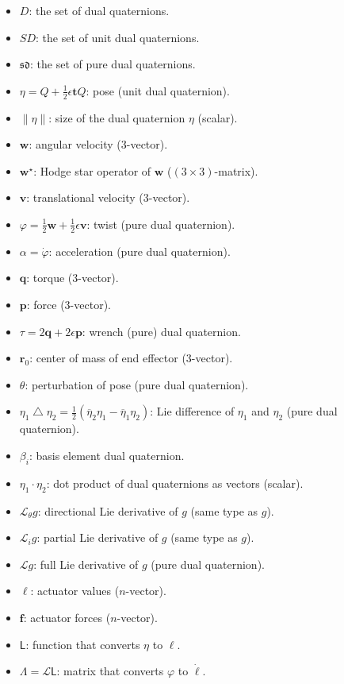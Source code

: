 \documentclass[reqno,12pt]{amsart}
\newcommand\starop[1]{#1^\star}
\newcommand\setdualquat{D}
\newcommand\setunitdualquat{SD}
\newcommand\setpuredualquat{\mathfrak{sd}}
\newcommand{\liediff}{\mathbin{\triangle}}
\newcommand{\liederiv}{\mathcal L}
\begin{document}
\begin{itemize}
\item $\setdualquat$: the set of dual quaternions.
\item $\setunitdualquat$: the set of unit dual quaternions.
\item $\setpuredualquat$: the set of pure dual quaternions.
\item $\eta = Q + \frac12 \epsilon \bm t Q$: pose (unit dual quaternion).
\item $\|\eta\|$: size of the dual quaternion $\eta$ (scalar).
\item $\bm w$: angular velocity (3-vector).
\item $\starop{\bm w}$: Hodge star operator of $\bm w$ ($(3\times3)$-matrix).
\item $\bm v$: translational velocity (3-vector).
\item $\varphi = \frac12\bm w + \frac12\epsilon \bm v$: twist (pure dual quaternion).
\item $\alpha = \dot\varphi$: acceleration (pure dual quaternion).
\item $\bm q$: torque (3-vector).
\item $\bm p$: force (3-vector).
\item $\tau = 2\bm q + 2 \epsilon \bm p$: wrench (pure) dual quaternion.
\item $\bm r_0$: center of mass of end effector (3-vector).
\item $\theta$: perturbation of pose (pure dual quaternion).
\item $\eta_1 \liediff \eta_2 = \tfrac12(\overline\eta_2\eta_1 - \overline\eta_1 \eta_2)$: Lie difference of $\eta_1$ and $\eta_2$ (pure dual quaternion).
\item $\beta_i$: basis element dual quaternion.
\item $\eta_1 \cdot \eta_2$: dot product of dual quaternions as vectors (scalar).
\item $\liederiv_\theta g$: directional Lie derivative of $g$ (same type as $g$).
\item $\liederiv_i g$: partial Lie derivative of $g$ (same type as $g$).
\item $\liederiv g$: full Lie derivative of $g$ (pure dual quaternion).
\item $\bm \ell$: actuator values ($n$-vector).
\item $\bm f$: actuator forces ($n$-vector).
\item $\mathsf L$: function that converts $\eta$ to $\bm \ell$.
\item $\mathsf \Lambda = \liederiv\mathsf L$: matrix that converts $\varphi$ to $\dot{\bm \ell}$.

\end{itemize}
\end{document}
